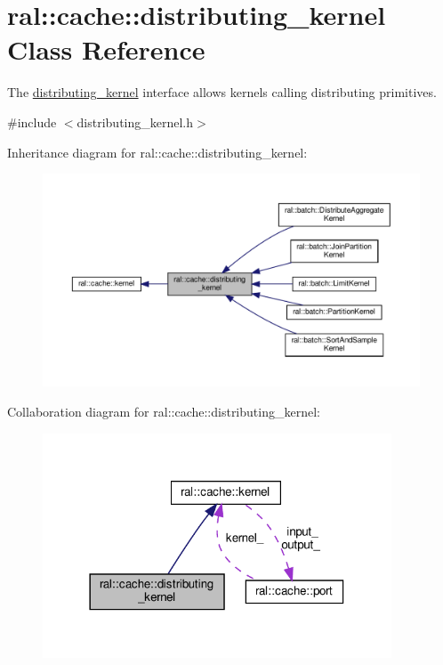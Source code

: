 \hypertarget{classral_1_1cache_1_1distributing__kernel}{}\section{ral\+:\+:cache\+:\+:distributing\+\_\+kernel Class Reference}
\label{classral_1_1cache_1_1distributing__kernel}


The \hyperlink{classral_1_1cache_1_1distributing__kernel}{distributing\+\_\+kernel} interface allows kernels calling distributing primitives.  




{\ttfamily \#include $<$distributing\+\_\+kernel.\+h$>$}



Inheritance diagram for ral\+:\+:cache\+:\+:distributing\+\_\+kernel\+:\nopagebreak
\begin{figure}[H]
\begin{center}
\leavevmode
\includegraphics[width=350pt]{classral_1_1cache_1_1distributing__kernel__inherit__graph}
\end{center}
\end{figure}


Collaboration diagram for ral\+:\+:cache\+:\+:distributing\+\_\+kernel\+:\nopagebreak
\begin{figure}[H]
\begin{center}
\leavevmode
\includegraphics[width=294pt]{classral_1_1cache_1_1distributing__kernel__coll__graph}
\end{center}
\end{figure}
